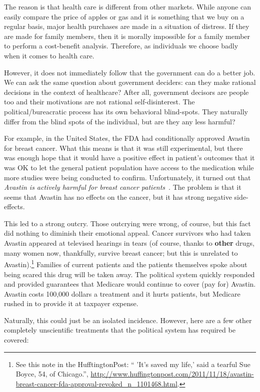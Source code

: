 The reason is that health care is different from other markets. While anyone
can easily compare the price of apples or gas and it is something that we buy
on a regular basis, major health purchases are made in a situation of distress.
If they are made for family members, then it is morally impossible for a family
member to perform a cost-benefit analysis. Therefore, as individuals we choose
badly when it comes to health care.

However, it does not immediately follow that the government can do a better
job. We can ask the same question about government deciders: can they make
rational decisions in the context of healthcare? After all, government decisors
are people too and their motivations are not rational self-disinterest. The
political/bureacratic process has its own behavioral blind-spots. They
naturally differ from the blind spots of the individual, but are they any less
harmful?

For example, in the United States, the FDA had conditionally approved Avastin
for breast cancer. What this means is that it was still experimental, but there
was enough hope that it would have a positive effect in patient's outcomes that
it was OK to let the general patient population have access to the medication
while more studies were being conducted to confirm. Unfortunately, it turned
out that \emph{Avastin is actively harmful for breast cancer
patients}~\cite{avastin-harfmul}. The problem is that it seems that Avastin has
no effects on the cancer, but it has strong negative side-effects.

This led to a strong outcry. Those outcrying were wrong, of course, but this
fact did nothing to diminish their emotional appeal. Cancer survivors who had
taken Avastin appeared at televised hearings in tears (of course, thanks to
\textbf{other} drugs, many women now, thankfully, survive breast cancer; but
this is unrelated to Avastin).\footnote{See this note in the HufftingtonPost:
`` 'It's saved my life,' said a tearful Sue Boyce, 54, of Chicago.'',
\url{http://www.huffingtonpost.com/2011/11/18/avastin-breast-cancer-fda-approval-revoked_n_1101468.html}.}
Families of current patients and the patients themselves spoke about being
scared this drug will be taken away. The political system quickly responded and
provided guarantees that Medicare would continue to cover (pay for) Avastin.
Avastin costs 100,000 dollars a treatment and it hurts patients, but Medicare
rushed in to provide it at taxpayer expense.

Naturally, this could just be an isolated incidence. However, here are a few
other completely unscientific treatments that the political system has required
be covered:

